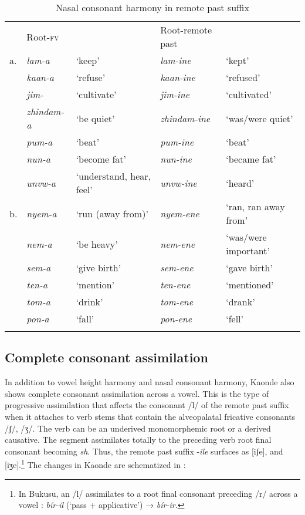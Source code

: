 \documentclass[output=paper]{langsci/langscibook}
\begin{document}
\begin{table}
\begin{tabular}{lllll}
\lsptoprule
 & Root-\textsc{fv} &  & Root-remote past & \\
a. & \textit{lam-a} & `keep' & \textit{lam-ine} & `kept' \\
 & \textit{kaan-a} & `refuse' & \textit{kaan-ine} & `refused' \\
 & \textit{jim-} & `cultivate' & \textit{jim-ine} & `cultivated' \\
 & \textit{zhindam-a} & `be quiet' & \textit{zhindam-ine} & `was/were quiet' \\
 & \textit{pum-a} & `beat' & \textit{pum-ine} & `beat' \\
 & \textit{nun-a} & `become fat' & \textit{nun-ine} & `became fat' \\
 & \textit{unvw-a} & `understand, hear, feel' & \textit{unvw-ine} & `heard' \\

b. & \textit{nyem-a} & `run (away from)' & \textit{nyem-ene} & `ran, ran away from' \\
 & \textit{nem-a} & `be heavy' & \textit{nem-ene} & `was/were important' \\
 & \textit{sem-a} & `give birth' & \textit{sem-ene} & `gave birth' \\
 & \textit{ten-a} & `mention' & \textit{ten-ene} & `mentioned' \\
 & \textit{tom-a} & `drink' & \textit{tom-ene} & `drank' \\
 & \textit{pon-a} & `fall' & \textit{pon-ene} & `fell' \\

\lspbottomrule
\end{tabular}

\caption{Nasal consonant harmony in remote past suffix}
\label{tab:4.kawasha}

\end{table}

\subsection{Complete consonant assimilation}


In addition to vowel height harmony and nasal consonant harmony, Kaonde also shows complete consonant assimilation across a vowel. This is the type of progressive assimilation that affects the consonant /l/ of the remote past suffix when it attaches to verb stems that contain the alveopalatal fricative consonants /ʃ/, /ʒ/. The verb can be an underived monomorphemic root or a derived causative. The segment assimilates totally to the preceding verb root final consonant becoming \textit{sh}. Thus, the remote past suffix -\textit{ile} surfaces as [iʃe], and [iʒe].\footnote{In Bukusu, an /l/ assimilates to a root final consonant preceding /r/ across a vowel \citep{hyman2003b}: \textit{bír-il} (‘pass + applicative’) → \textit{bír-ir}.} The changes in Kaonde are schematized in :
\end{document}
